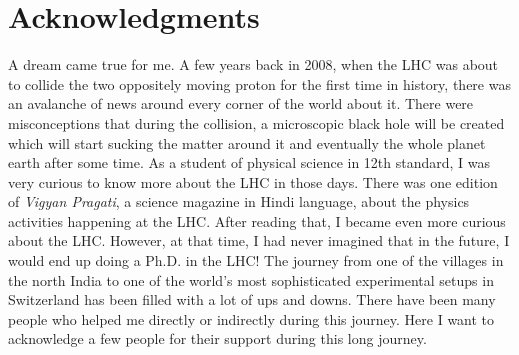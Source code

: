 \chapter{Acknowledgments}

\lettrine[lines=2, findent=3pt, nindent=0pt]{A}{} dream came true for me. A few 
years back in 2008, when the LHC was about to collide the two oppositely
moving proton for the first time in history, there was an avalanche of news
around every corner of the world about it. There were misconceptions that
during the collision, a microscopic black hole will be created which will start 
sucking the matter around it and eventually the whole planet earth after some time.
As a student of physical science in 12th standard, I was very curious to know 
more about the LHC in those days. There was one edition of \textit{Vigyan Pragati},
a science magazine in Hindi language, about the physics activities happening at the
LHC. After reading that, I became even more curious about the LHC. However, at 
that time, I had never imagined that in the future, I would end up doing a Ph.D. 
in the LHC! The journey from one of the villages in the north India to one of the world's most 
sophisticated experimental setups in Switzerland has been filled with a 
lot of ups and downs. There have been many people who helped me directly or 
indirectly during this journey. Here I want to acknowledge a few people for their support during this long journey.

